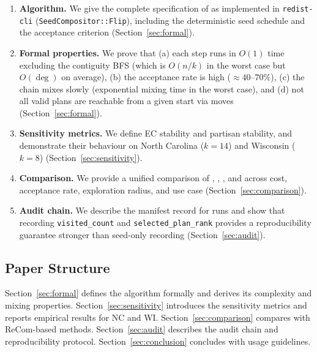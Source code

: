 \begin{enumerate}
  \item \textbf{Algorithm.} We give the complete specification of \flip{} as
        implemented in \texttt{redist-cli} (\texttt{SeedCompositor::Flip}),
        including the deterministic seed schedule and the acceptance criterion
        (Section~\ref{sec:formal}).

  \item \textbf{Formal properties.} We prove that (a) each step runs in $O(1)$
        time excluding the contiguity BFS (which is $O(n/k)$ in the worst case
        but $O(\deg)$ on average), (b) the acceptance rate is high ($\approx
        40$--$70\%$), (c) the chain mixes slowly (exponential mixing time in
        the worst case), and (d) not all valid plans are reachable from a
        given start via \flip{} moves (Section~\ref{sec:formal}).

  \item \textbf{Sensitivity metrics.} We define EC stability and partisan
        stability, and demonstrate their behaviour on North Carolina
        ($k = 14$) and Wisconsin ($k = 8$) (Section~\ref{sec:sensitivity}).

  \item \textbf{Comparison.} We provide a unified comparison of \flip{},
        \sburst{}, \be{}, and \cs{} across cost, acceptance rate, exploration
        radius, and use case (Section~\ref{sec:comparison}).

  \item \textbf{Audit chain.} We describe the manifest record for \flip{}
        runs and show that recording \texttt{visited\_count} and
        \texttt{selected\_plan\_rank} provides a reproducibility guarantee
        stronger than seed-only recording (Section~\ref{sec:audit}).
\end{enumerate}

\subsection{Paper Structure}

Section~\ref{sec:formal} defines the \flip{} algorithm formally and derives
its complexity and mixing properties.
Section~\ref{sec:sensitivity} introduces the sensitivity metrics and reports
empirical results for NC and WI.
Section~\ref{sec:comparison} compares \flip{} with ReCom-based methods.
Section~\ref{sec:audit} describes the audit chain and reproducibility protocol.
Section~\ref{sec:conclusion} concludes with usage guidelines.
